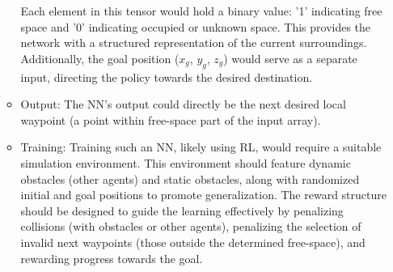 \begin{itemize}
\begin{itemize}
                    Each element in this tensor would hold a binary value: '1' indicating free space and '0' indicating occupied or unknown space. 
                    This provides the network with a structured representation of the current surroundings. 
                    Additionally, the goal position ($x_g$, $y_g$, $z_g$) would serve as a separate input, directing the policy towards the desired destination. 
                    \item Output: The \ac{NN}'s output could directly be the next desired local waypoint (a point within free-space part of the input array).
                    \item Training: Training such an NN, likely using \ac{RL}, would require a suitable simulation environment. 
                    This environment should feature dynamic obstacles (other agents) and static obstacles, along with randomized initial and goal positions to promote generalization. 
                    The reward structure should be designed to guide the learning effectively by penalizing collisions (with obstacles or other agents), penalizing the selection of invalid next waypoints (those outside the determined free-space), and rewarding progress towards the goal.
                \end{itemize}
        \end{itemize}

        


